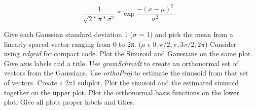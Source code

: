 \documentclass[11pt]{article}
\newenvironment{qparts}{\begin{enumerate}[{(}a{)}]}{\end{enumerate}}
\begin{document}
\begin{qparts}
  \begin{equation}
      \frac{1}{\sqrt{2*\pi*\sigma^2}} * \exp{\frac{-(x-\mu)^2}{\sigma^2}}
  \end{equation}
  
  Give each Gaussian standard deviation 1 ($\sigma$ = 1) and pick the mean from a linearly spaced vector ranging from 0 to 2π. ($\mu$ $\epsilon$ ${0, \pi/2, \pi, 3\pi/2, 2\pi}$) Consider using \emph{ndgrid} for compact code. Plot the Sinusoid and Gaussians on the same plot. Give axis labels and a title. Use \emph{gramSchmidt} to create an orthonormal set of vectors from the Gaussians. Use \emph{orthoProj} to estimate the sinusoid from that set of vectors. Create a 2x1 subplot. Plot the sinusoid and the estimated sinusoid together on the upper plot. Plot the orthonormal basis functions on the lower plot. Give all plots proper labels and titles.
  
  
  \end{qparts}
\end{document}
